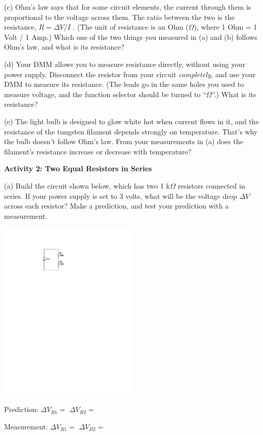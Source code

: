 \newpage
(c) Ohm's law says that for some circuit elements, the current through them is proportional to the voltage across them.  The ratio between the two is the resistance, $R=\Delta V / I$ .  (The unit of resistance is an Ohm ($\Omega$), where 1 Ohm = 1 Volt / 1 Amp.)  Which one of the two things you measured in (a) and (b) follows Ohm's law, and what is its resistance?
\answerspace{0.7 in}

(d) Your DMM allows you to measure resistance directly, without using your power supply.  Disconnect the resistor from your circuit \textit{completely,} and use your DMM to measure its resistance.  (The leads go in the same holes you used to measure voltage, and the function selector should be turned to ``$\Omega$''.)  What is its resistance?
\answerspace{0.5 in}

(e) The light bulb is designed to glow white hot when current flows in it, and the resistance of the tungsten filament depends strongly on temperature.  That's why the bulb doesn't follow Ohm's law.  From your measurements in (a) does the filament's resistance increase or decrease with temperature?
\answerspace{0.6 in}

\textbf{Activity 2: Two Equal Resistors in Series} \par
\nopagebreak
(a) Build the circuit shown below, which has two 1 k$\Omega$ resistors connected in series.  If your power supply is set to 3 volts, what will be the voltage drop $\Delta V$ across each resistor?  Make a prediction, and test your prediction with a measurement.

\begin{minipage}{0.4\textwidth} 
\hspace{0.5in}\includegraphics[width=0.5\textwidth]{electric_circuits2/circ_diag2_bw.pdf}
\end{minipage}
\begin{minipage}{0.59\textwidth} 
\vspace{0.2 in}
Prediction: \hspace{0.4 in} $\Delta V_{R1} =$ \hspace{0.8 in} $\Delta V_{R2}=$
\vspace{0.2 in}

Measurement: \hspace{0.2 in} $\Delta V_{R1} =$ \hspace{0.8 in} $\Delta V_{R2}=$ 
\answerspace{0.2 in}
\end{minipage}

